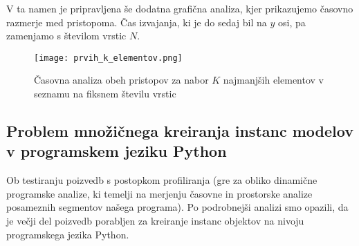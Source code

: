 \documentclass[a4paper,12pt,openright]{book}
\begin{document}
        V ta namen je pripravljena še dodatna grafična analiza, kjer prikazujemo časovno razmerje med pristopoma. Čas izvajanja, ki je do sedaj bil na $y$ osi, pa zamenjamo s številom vrstic $N$.

        \begin{figure}[H]
            \centerline{\texttt{[image: prvih\_k\_elementov.png]}}
            \caption{Časovna analiza obeh pristopov za nabor $K$ najmanjših elementov v seznamu na fiksnem številu vrstic}
            \label{sl:prvih_k_elementov}
        \end{figure}

        \subsection{Problem množičnega kreiranja instanc modelov v programskem  jeziku Python}

        Ob testiranju poizvedb s postopkom profiliranja (gre za obliko dinamične programske analize, ki temelji na merjenju časovne in prostorske analize posameznih segmentov našega programa). Po podrobnejši analizi smo opazili, da je večji del poizvedb porabljen za kreiranje instanc objektov na nivoju programskega jezika Python.
\end{document}
